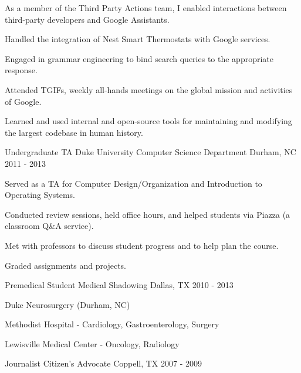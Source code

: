 \begin{cventries}
{\begin{cvparagraph}
            As a member of the Third Party Actions team, I enabled interactions between third-party developers and Google Assistants.
         \end{cvparagraph}
	    \begin{cvitems}
            \item{Handled the integration of Nest Smart Thermostats with Google services.}
            \item{Engaged in grammar engineering to bind search queries to the appropriate response.}
            \item{Attended TGIFs, weekly all-hands meetings on the global mission and activities of Google.}
            \item{Learned and used internal and open-source tools for maintaining and modifying the largest codebase in human history.}
        \end{cvitems}
        }
    \cventry
        {Undergraduate TA}
        {Duke University Computer Science Department}
        {Durham, NC}
        {2011 - 2013}
        {
            \begin{cvitems}
                \item{Served as a TA for Computer Design/Organization and Introduction to Operating Systems.}
                \item{Conducted review sessions, held office hours, and helped students via Piazza (a classroom Q\&A service).}
                \item{Met with professors to discuss student progress and to help plan the course.}
                \item{Graded assignments and projects.}
            \end{cvitems}
        }
    \cventry
        {Premedical Student}
        {Medical Shadowing}
        {Dallas, TX}
        {2010 - 2013}
        {
            \begin{cvitems}
                \item{Duke Neurosurgery (Durham, NC)}
                \item{Methodist Hospital - Cardiology, Gastroenterology, Surgery}
                \item{Lewisville Medical Center - Oncology, Radiology}
            \end{cvitems}
        }
    \cventry
        {Journalist}
        {Citizen's Advocate}
        {Coppell, TX}
        {2007 - 2009}
\end{cventries}
